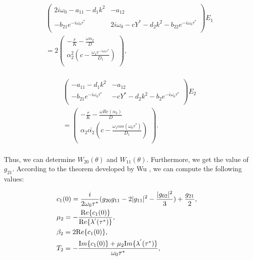 \documentclass[10pt]{amsart}
\theoremstyle{definition}
\begin{document}
\begin{align}\label{eq:4.41}
&\left(
\begin{array}{cc}
  {\displaystyle{2i\omega_0-a_{11}-d_1k^2}} & {\displaystyle{-a_{12}}}\\ \\
  {\displaystyle{-b_{21} e^{-i\omega_0 \tau^*}}} & {\displaystyle{2i\omega_0-cY^*-d_2k^2-b_{22}e^{-i\omega_0 \tau^*}}}\\
  \end{array}
  \right)E_1\nonumber\\
  &= 2\left(
     \begin{array}{c}
  {\displaystyle{-\frac{r}{K}-\frac{\omega \alpha_2}{D}}} \\
  {\displaystyle{\alpha_2^2\left(c-\frac{ \omega_1 e^{-i\omega_0 \tau^*}}{D_1}\right)}}\\
\end{array}
\right),
\end{align}
\\
\begin{align}\label{eq:4.42}
&\left(
   \begin{array}{cc}
 {\displaystyle{-a_{11}-d_1k^2}} & {\displaystyle{-a_{12}}}\\
     {\displaystyle{-b_{21} e^{-i\omega_0 \tau^*}}} & {\displaystyle{-cY^*-d_2k^2-b_2 e^{-i\omega_0 \tau^*}}}\\
 \end{array}
 \right)E_{2} \nonumber\\
& = \left(
     \begin{array}{c}
   {\displaystyle{-\frac{r}{K}-\frac{\omega Re(\alpha_2)}{D}}} \\
  {\displaystyle{\alpha_2 \bar{\alpha_2}\left(c-\frac{ \omega_1 cos(\omega_0 \tau^*)}{D_1}\right)}}\\
\end{array}
\right).
\end{align}
\\
Thus, we can determine $W_{20} (\theta)$ and $W_{11} (\theta)$. Furthermore, we get the value of $g_{21}$. According to the theorem developed by Wu \cite{WU96}, we can compute the following values:

\begin{align}\label{eq:43}
&c_{1} (0) = \frac{i}{2 \omega_0 \tau^{*}} (g_{20} g_{11} - 2 |g_{11}|^2 - \frac{|g_{02}|^2}{3}) + \frac{g_{21}}{2}, \nonumber\\
&\mu_{2} = - \frac{{\mbox Re} \{c_{1} (0)\}}{{\mbox Re} \{\lambda^{'} (\tau^{*})\}}, \nonumber\\
&\beta_{2} = 2 {\mbox Re} \{c_{1} (0)\}, \\
&T_{2} = - \frac{{\mbox Im} \{c_{1} (0)\} + \mu_{2} {\mbox Im}\{\lambda^{'} (\tau^{*})\}}{\omega_0\tau^{*}}, \nonumber
\end{align}
\end{document}
